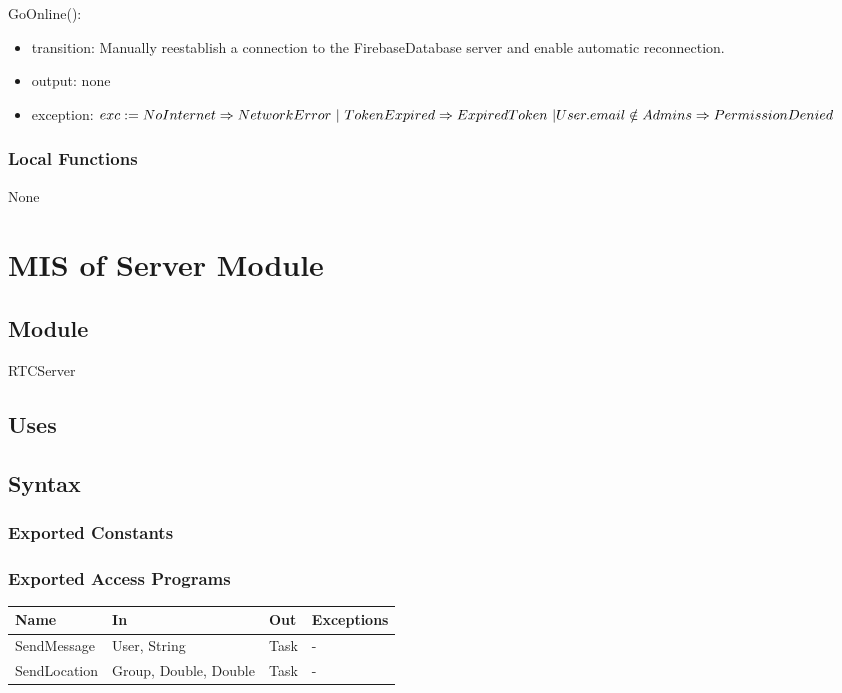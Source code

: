 \documentclass[12pt, titlepage]{article}
\begin{document}
\begin{itemize}
\noindent GoOnline():
\begin{itemize}
\item transition: Manually reestablish a connection to the FirebaseDatabase server and enable automatic reconnection.
\item output: none
\item exception: $exc := NoInternet \Rightarrow NetworkError\ | \ TokenExpired \Rightarrow ExpiredToken\ | \\ User.email \notin Admins \Rightarrow PermissionDenied$
\end{itemize}

\subsubsection{Local Functions}

None

\newpage

\section{MIS of Server Module} \label{mServer}

\subsection{Module}

RTCServer

\subsection{Uses}

\subsection{Syntax}

\subsubsection{Exported Constants}

\subsubsection{Exported Access Programs}

\begin{center}
\begin{tabular}{p{2cm} p{4cm} p{4cm} p{2cm}}
\hline
\textbf{Name} & \textbf{In} & \textbf{Out} & \textbf{Exceptions} \\
\hline
SendMessage & User, String & Task & - \\
SendLocation & Group, Double, Double & Task & - \\


\end{tabular}
\end{center}
\end{itemize}
\end{document}
